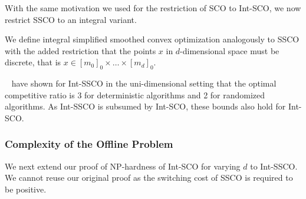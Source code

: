 With the same motivation we used for the restriction of SCO to Int-SCO, we now restrict SSCO to an integral variant.

\begin{problem}
We define integral simplified smoothed convex optimization analogously to SSCO with the added restriction that the points $x$ in $d$-dimensional space must be discrete, that is $x \in [m_0]_0 \times \dots \times [m_d]_0$.
\end{problem}

\citeauthor*{Albers2018}~\cite{Albers2018} have shown for Int-SSCO in the uni-dimensional setting that the optimal competitive ratio is 3 for deterministic algorithms and 2 for randomized algorithms. As Int-SSCO is subsumed by Int-SCO, these bounds also hold for Int-SCO.

\subsubsection{Complexity of the Offline Problem}

We next extend our proof of NP-hardness of Int-SCO for varying $d$ to Int-SSCO. We cannot reuse our original proof as the switching cost of SSCO is required to be positive.

